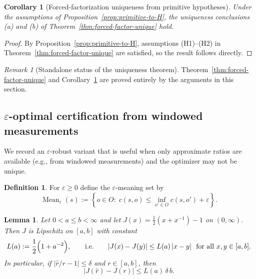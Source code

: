 \documentclass[11pt,reqno]{amsart}
\newtheorem{lemma}[theorem]{Lemma}
\newtheorem{corollary}[theorem]{Corollary}
\theoremstyle{definition}
\newtheorem{definition}[theorem]{Definition}
\theoremstyle{remark}
\newtheorem{remark}[theorem]{Remark} %
\newcommand{\1}{\mathbf{1}}
\newcommand{\Mean}{\operatorname{Mean}}
\newcommand{\eps}{\varepsilon}
\begin{document}
\begin{corollary}[Forced-factorization uniqueness from primitive hypotheses]\label{cor:forced-factor-unique-primitive}
Under the assumptions of Proposition~\ref{prop:primitive-to-H},
the uniqueness conclusions (a) and (b) of Theorem~\ref{thm:forced-factor-unique} hold.
\end{corollary}

\begin{proof}
By Proposition~\ref{prop:primitive-to-H}, assumptions (H1)--(H2) in
Theorem~\ref{thm:forced-factor-unique} are satisfied, so the result follows directly.
\end{proof}

\begin{remark}[Standalone status of the uniqueness theorem]
Theorem~\ref{thm:forced-factor-unique} and
Corollary~\ref{cor:forced-factor-unique-primitive}
are proved entirely by the arguments in this section.
\end{remark}


\subsection{\texorpdfstring{$\eps$-optimal certification from windowed measurements}{Epsilon-optimal certification from windowed measurements}}\label{subsec:eps-opt}

We record an $\eps$-robust variant that is useful when only approximate ratios are
available (e.g., from windowed measurements) and the optimizer may not be unique.

\begin{definition}\label{def:eps-meaning}
For $\eps\ge 0$ define the $\eps$-meaning set by
\[
\Mean_\eps(s)
:=\left\{o\in O:\; c(s,o)\le \inf_{o'\in O}c(s,o')+\eps\right\}.
\]
\end{definition}

\begin{lemma}\label{lem:J-Lipschitz}
Let $0<a\le b<\infty$ and let $J(x)=\tfrac12(x+x^{-1})-1$ on $(0,\infty)$.
Then $J$ is Lipschitz on $[a,b]$ with constant
\[
L(a):=\frac12\Bigl(1+a^{-2}\Bigr),
\qquad\text{i.e.}\qquad
|J(x)-J(y)|\le L(a)\,|x-y| \ \ \text{for all }x,y\in[a,b].
\]
In particular, if $|\widehat r/r-1|\le \delta$ and $r\in[a,b]$, then
\[
|J(\widehat r)-J(r)|\le L(a)\,\delta\,b.
\]
\end{lemma}
\end{document}
